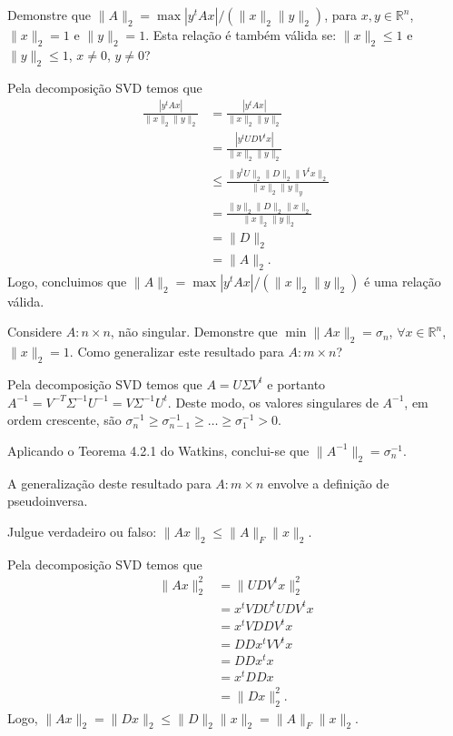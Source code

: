 \begin{questions}
    \question Demonstre que $\| A \|_2 = \max | y^t A x | / \left( \| x \|_2 \| y \|_2 \right)$, para $x, y \in \mathbb{R}^n$, $\| x \|_2 = 1$ e $\| y \|_2 = 1$. Esta rela\c{c}\~{a}o \'{e} tamb\'{e}m v\'{a}lida se: $\| x \|_2 \leq 1$ e $\| y \|_2 \leq 1$, $x \neq 0$, $y \neq 0$?
    \begin{solution}
        Pela decomposi\c{c}\~{a}o SVD temos que
        \begin{align*}
            \frac{| y^t A x |}{\| x \|_2 \| y \|_2} &= \frac{| y^t A x|}{\| x \|_2 \| y \|_2} \\
            &= \frac{| y^t U D V^t x |}{\| x \|_2 \| y \|_2} \\
            &\leq \frac{\| y^t U \|_2 \| D \|_2 \| V^t x \|_2}{\| x \|_2 \| y \|_y} \\
            &= \frac{\| y \|_2 \| D \|_2 \| x \|_2}{\| x \|_2 \| y \|_2} \\
            &= \| D \|_2 \\
            &= \| A \|_2.
        \end{align*}
        Logo, concluimos que $\| A \|_2 = \max | y^t A x | / \left( \| x \|_2 \| y \|_2 \right)$ \'{e} uma rela\c{c}\~{a}o v\'{a}lida. 
    \end{solution}

    \question Considere $A : n \times n$, n\~{a}o singular. Demonstre que $\min \| A x \|_2 = \sigma_n$, $\forall x \in \mathbb{R}^n$, $\| x \|_2 = 1$. Como generalizar este resultado para $A : m \times n$?
    \begin{solution}
        Pela decomposi\c{c}\~{a}o SVD temos que $A = U \Sigma V^t$ e portanto $A^{-1} = V^{-T} \Sigma^{-1} U^{-1} = V \Sigma^{-1} U^t$. Deste modo, os valores singulares de $A^{-1}$, em ordem crescente, s\~{a}o $\sigma_n^{-1} \geq \sigma_{n - 1}^{-1} \geq \ldots \geq \sigma_1^{-1} > 0$.

        Aplicando o Teorema 4.2.1 do Watkins\nocite{Watkins:2004:fundamentals}, conclui-se que $\| A^{-1} \|_2 = \sigma_n^{-1}$.

        A generaliza\c{c}\~{a}o deste resultado para $A : m \times n$ envolve a defini\c{c}\~{a}o de pseudoinversa.
    \end{solution}

    \question Julgue verdadeiro ou falso: $\| A x \|_2 \leq \| A \|_F \| x \|_2$.
    \begin{solution}
        Pela decomposi\c{c}\~{a}o SVD temos que
        \begin{align*}
            \| A x \|_2^2 &= \| U D V^t x \|_2^2 \\
            &= x^t V D U^t U D V^t x \\
            &= x^t V D D V^t x \\
            &= D D x^t V V^t x \\
            &= D D x^t x \\
            &= x^t D D x \\
            &= \| D x \|_2^2.
        \end{align*}
        Logo, $\| A x \|_2 = \| D x \|_2 \leq \| D \|_2 \| x \|_2 = \| A \|_F \| x \|_2$.
    \end{solution}


\end{questions}

